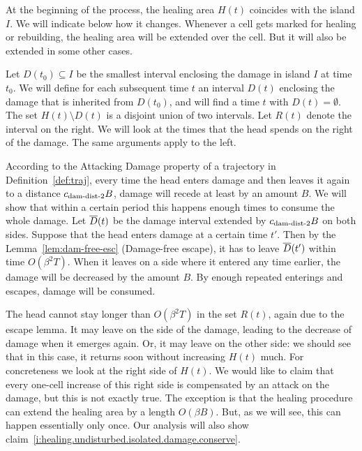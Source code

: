 \documentclass[12pt]{memoir}
\def\B{B}
\newcommand{\D}{D}
\renewcommand{\H}{H}
\newcommand{\R}{R}
\newcommand{\Tu}{T}
\newcommand{\cns}[1]{c_{\textrm{\upshape #1}}}
\newcommand{\cDamDist}[1]{\cns{dam-dist-#1}}
\begin{document}
\begin{Proof}
At the beginning of the process, the healing area \( \H(t) \) coincides with the island \( I \).
We will indicate below how it changes.
Whenever a cell gets marked for healing or rebuilding, the healing area will be
extended over the cell.
But it will also be extended in some other cases.

Let \( \D(t_{0})\subseteq I \) be the smallest interval enclosing the damage in island
\( I \) at time \( t_{0} \).
We will define for each subsequent time \( t \) an interval \( \D(t) \) enclosing the damage
that is inherited from \( \D(t_{0}) \), and will find a time \( t \) with \( \D(t)=\emptyset \).
The set \( \H(t)\setminus \D(t) \) is a disjoint union of two intervals.
Let \( \R(t) \) denote the interval on the right.
We will look at the times that the head spends on the right of the damage.
The same arguments apply to the left.

\begin{sloppypar}
According to the Attacking Damage property of a trajectory in 
Definition~\ref{def:traj}, every time the head enters damage and then leaves
it again to a distance \( \cDamDist2\B \), damage will recede at least by an amount \( \B \).
We will show that within a certain period this happens enough times to
consume the whole damage.
Let \( \ol \D(t) \) be the damage interval extended by \( \cDamDist2\B \) on both sides.
Suppose that the head enters damage at a certain time \( t' \).
Then by the Lemma~\ref{lem:dam-free-esc} (Damage-free escape),
it has to leave \( \ol \D(t') \) within time \( O(\beta^{2}\Tu) \).
When it leaves on a side where it entered any time earlier, the damage will
be decreased by the amount \( \B \).
By enough repeated enterings and escapes, damage will be consumed.
  \end{sloppypar}

The head cannot stay longer than \( O(\beta^{2}\Tu) \) in the set
\( \R(t) \), again due to the escape lemma.
It may leave on the side of the damage, leading to the decrease of damage when
it emerges again.
Or, it may leave on the other side: we should see that
in this case, it returns soon without increasing \( \H(t) \) much.
For concreteness we look at the right side of \( \H(t) \).
We would like to claim that every one-cell increase of this right side
is compensated by an attack on the damage, but this is not exactly
true.
The exception is that the healing procedure can extend the healing area by
a length \( O(\beta\B) \).
But, as we will see, this can happen essentially only once.
Our analysis will also show
claim~\eqref{i:healing.undisturbed.isolated.damage.conserve}.


\end{Proof}
\end{document}
